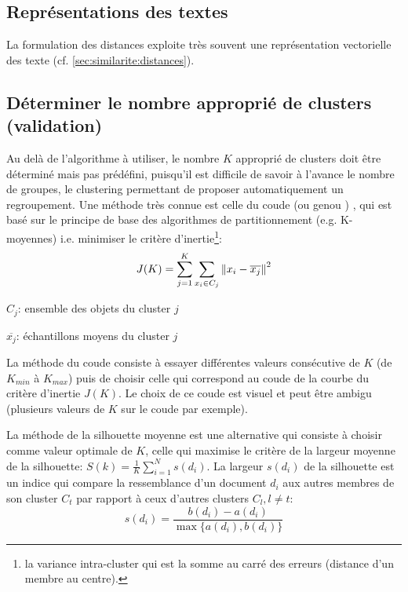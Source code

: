 \subsection{Représentations des textes}
La formulation des distances exploite très souvent une représentation vectorielle des texte (cf.  \ref{sec:similarite:distances}). 


\subsection{Déterminer le nombre approprié de clusters (validation)}


 Au delà de l’algorithme à utiliser, le nombre $K$ approprié de clusters doit être déterminé mais pas prédéfini, puisqu'il est difficile de savoir à l'avance le nombre de groupes, le clustering permettant de proposer automatiquement un regroupement. Une méthode très connue est celle du \og coude \fg{}  (ou \og genou \fg{}) \citep{halkidi2001clustvalidation}, qui est basé sur le principe de base des algorithmes de partitionnement (e.g. K-moyennes) i.e. minimiser le critère d'inertie\footnote{la variance intra-cluster qui est la somme au carré des erreurs (distance d'un membre au centre).}:
\[J(K) = \sum\limits_{j=1}^K\sum\limits_{x_i \in C_j}\left\lVert x_i-\overline{x_j}\right\rVert^2\]

$C_j$: ensemble des objets du cluster $j$

$\overline{x_j}$: échantillons moyens du cluster $j$

La méthode du coude consiste à essayer différentes valeurs consécutive de $K$ (de $K_{min}$ à $K_{max}$) puis de choisir celle qui correspond au coude de la courbe du critère d'inertie $J(K)$. Le choix de ce coude est visuel et peut être ambigu (plusieurs valeurs de $K$ sur le coude par exemple). 

La méthode de la silhouette moyenne \citep{rousseeuw1987silhouetteclusternumber} est une alternative qui consiste à choisir comme valeur optimale de $K$, celle qui maximise le critère de la largeur moyenne de la silhouette: $S(k) = \frac{1}{K}\sum\limits_{i=1}^N s(d_i)$. La largeur $s(d_i)$ de la silhouette est un indice qui compare la ressemblance d'un document $d_i$ aux autres membres de son cluster $C_t$ par rapport à ceux d'autres clusters $C_l, l \neq t$:
\[s(d_i) = \frac{b(d_i) - a(d_i)}{\max\lbrace a(d_i),b(d_i)\rbrace}\]

